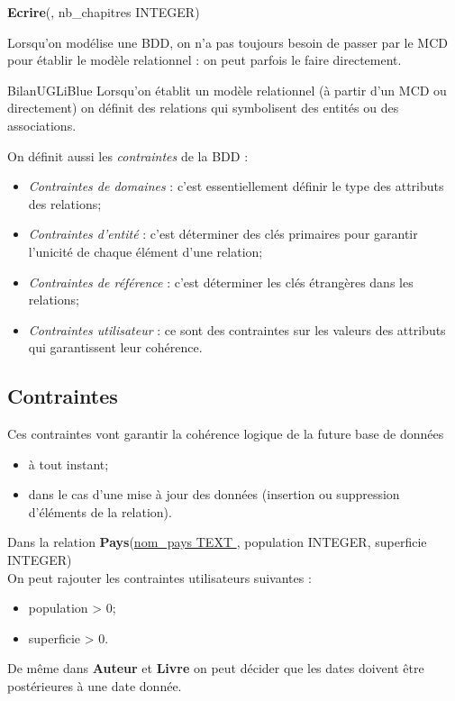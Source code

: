 \documentclass[10pt,firamath,cours]{nsi}
\begin{document}
		\textbf{Ecrire}(\uline{}, nb\_chapitres INTEGER)\\


\begin{remarque}[]
	Lorsqu'on modélise une BDD, on n'a pas toujours besoin de passer par le MCD pour établir le modèle relationnel : on peut parfois le faire directement.
\end{remarque}
	
\begin{encadrecolore}{Bilan}{UGLiBlue}
	Lorsqu'on établit un modèle relationnel (à partir d'un MCD ou directement) on définit des relations qui symbolisent des entités ou des associations.

	On définit aussi les \textit{contraintes} de la BDD :
	\begin{itemize}
		\item	\textit{Contraintes de domaines} : c'est essentiellement définir le type des attributs des relations;
		\item	\textit{Contraintes d'entité} : c'est déterminer des clés primaires pour garantir l'unicité de chaque élément d'une relation;
		\item 	\textit{Contraintes de référence} : c'est déterminer les clés étrangères dans les relations;
		\item 	\textit{Contraintes utilisateur} : ce sont des contraintes sur les valeurs des attributs qui garantissent leur cohérence.
	\end{itemize}
\end{encadrecolore}	

\subsection{Contraintes}
	Ces contraintes vont garantir la cohérence logique de la future base de données
	\begin{itemize}
		\item	à tout instant;
		\item	dans le cas d'une mise à jour des données (insertion ou suppression d'éléments de la relation).
	\end{itemize}

\begin{exemple}
	Dans la relation \textbf{Pays}(\uline{nom\_pays TEXT }, population INTEGER, superficie INTEGER)\\

	On peut rajouter les contraintes utilisateurs suivantes :
	\begin{itemize}
		\item 	population > 0;
		\item 	superficie > 0.
	\end{itemize}
	De même dans \textbf{Auteur} et \textbf{Livre} on peut décider que les dates doivent être postérieures à une date donnée.	
\end{exemple}
\end{document}
